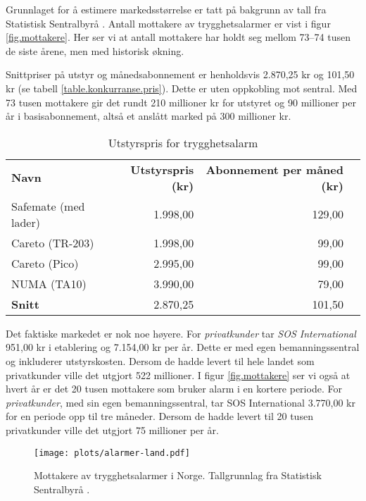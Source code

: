 Grunnlaget for å estimere markedsstørrelse er tatt på bakgrunn av tall fra
Statistisk Sentralbyrå \cite{iplos.2013, ssb.trygghetsalarm}. Antall mottakere
av trygghetsalarmer er vist i figur \vref{fig.mottakere}. Her ser vi at antall
mottakere har holdt seg mellom 73--74 tusen de siste årene, men med historisk
økning.

Snittpriser på utstyr og månedsabonnement er henholdsvis 2.870,25 kr og 101,50
kr (se tabell \vref{table.konkurranse.pris}). Dette er uten oppkobling mot
sentral.  Med 73 tusen mottakere
gir det rundt 210 millioner kr for utstyret og 90 millioner per år i
basisabonnement, altså et anslått marked på 300 millioner kr.

\begin{table}
  \centering
  \begin{tabular}{lrrr}
    \textbf{Navn} &
    \textbf{Utstyrspris (kr)} &
    \textbf{Abonnement per måned (kr)}\\
    Safemate (med lader) & 1.998,00 & 129,00 \\
    Careto (TR-203)      & 1.998,00 &  99,00 \\
    Careto (Pico)        & 2.995,00 &  99,00 \\
    NUMA (TA10)          & 3.990,00 &  79,00 \\
    \textbf{Snitt}       & 2.870,25 & 101,50 \\
  \end{tabular}
  \caption{Utstyrspris for trygghetsalarm}
  \label{table.konkurranse.pris}
\end{table}

Det faktiske markedet er nok noe høyere. For \textit{privatkunder} tar
\textit{SOS International} 951,00 kr i etablering og 7.154,00 kr per år. Dette
er med egen bemanningssentral og inkluderer utstyrskosten. Dersom de hadde
levert til hele landet som privatkunder ville det utgjort 522 millioner.  I
figur \vref{fig.mottakere} ser vi også at hvert år er det 20 tusen mottakere
som bruker alarm i en kortere periode. For \textit{privatkunder}, med sin egen
bemanningssentral, tar SOS International 3.770,00 kr for en periode opp til tre
måneder.  Dersom de hadde levert til 20 tusen privatkunder ville det utgjort 75
millioner per år.

\begin{figure}
  \texttt{[image: plots/alarmer-land.pdf]}
  \caption{Mottakere av trygghetsalarmer i Norge.
    Tallgrunnlag fra Statistisk Sentralbyrå \cite{iplos.2013, ssb.trygghetsalarm}.}
  \label{fig.mottakere}
\end{figure}

